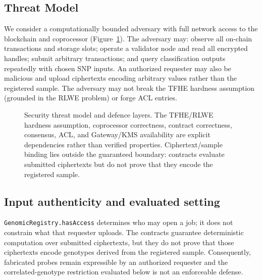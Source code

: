 \documentclass[10pt,twocolumn]{article}
\begin{document}
\subsection{Threat Model}

We consider a computationally bounded adversary with full network access to the
blockchain and coprocessor (Figure~\ref{fig:security}).  The adversary may: observe
all on-chain transactions and storage slots; operate a validator node and read all
encrypted handles; submit arbitrary transactions; and query classification outputs
repeatedly with chosen SNP inputs.  An authorized requester may also be malicious and
upload ciphertexts encoding arbitrary values rather than the registered sample.  The
adversary may not break the TFHE hardness
assumption (grounded in the RLWE problem) or forge ACL entries.

\begin{figure}[t]
  \centering
  \caption{Security threat model and defence layers.  The TFHE/RLWE hardness
  assumption, coprocessor correctness, contract correctness, consensus, ACL, and
  Gateway/KMS availability are explicit dependencies rather than verified properties.
  Ciphertext/sample binding lies outside the guaranteed boundary: contracts evaluate
  submitted ciphertexts but do not prove that they encode the registered sample.}
  \label{fig:security}
\end{figure}

\subsection{Input authenticity and evaluated setting}

\texttt{GenomicRegistry.hasAccess} determines who may open a job; it does not constrain
what that requester uploads.  The contracts guarantee deterministic computation over
submitted ciphertexts, but they do not prove that those ciphertexts encode genotypes
derived from the registered sample.  Consequently, fabricated probes remain expressible
by an authorized requester and the correlated-genotype restriction evaluated below is
not an enforceable defense.
\end{document}
